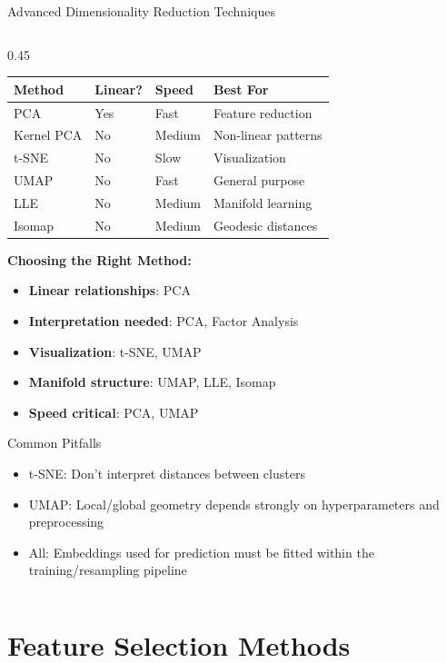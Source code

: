 \documentclass[aspectratio=169,11pt]{beamer}
\begin{document}
\begin{frame}[fragile]{Advanced Dimensionality Reduction Techniques}
\begin{columns}
\begin{column}{0.45\textwidth}
\begin{table}
\centering
\tiny
\begin{tabular}{p{1.5cm}p{1cm}p{1cm}p{1.5cm}}
\toprule
\textbf{Method} & \textbf{Linear?} & \textbf{Speed} & \textbf{Best For} \\
\midrule
PCA & Yes & Fast & Feature reduction \\
Kernel PCA & No & Medium & Non-linear patterns \\
t-SNE & No & Slow & Visualization \\
UMAP & No & Fast & General purpose \\
LLE & No & Medium & Manifold learning \\
Isomap & No & Medium & Geodesic distances \\
\bottomrule
\end{tabular}
\end{table}

\vspace{0.3cm}
\textbf{Choosing the Right Method:}
\begin{itemize}
\item \textbf{Linear relationships}: PCA
\item \textbf{Interpretation needed}: PCA, Factor Analysis
\item \textbf{Visualization}: t-SNE, UMAP
\item \textbf{Manifold structure}: UMAP, LLE, Isomap
\item \textbf{Speed critical}: PCA, UMAP
\end{itemize}

\begin{alertblock}{Common Pitfalls}
\begin{itemize}
\item t-SNE: Don't interpret distances between clusters
\item UMAP: Local/global geometry depends strongly on hyperparameters and preprocessing
\item All: Embeddings used for prediction must be fitted within the training/resampling pipeline
\end{itemize}
\end{alertblock}
\end{column}
\end{columns}
\end{frame}

\section{Feature Selection Methods}
\end{document}
